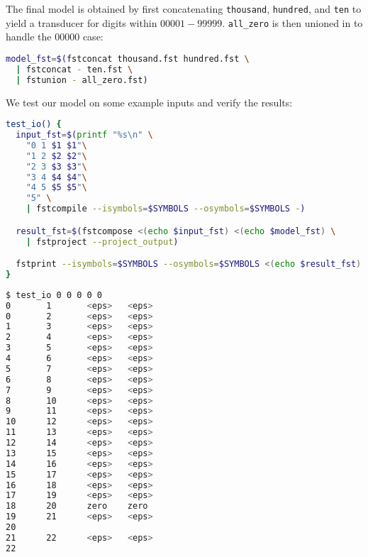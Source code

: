 \documentclass[a4paper,oneside,reqno]{amsart}
\begin{document}
\begin{enumerate}[label=\arabic*.]
    The final model is obtained by first concatenating \texttt{thousand},
    \texttt{hundred}, and \texttt{ten} to yield a transducer for
    digits within $00001-99999$. \texttt{all\_zero} is then
    unioned in to handle the $00000$ case:
    \begin{lstlisting}[language=bash]
model_fst=$(fstconcat thousand.fst hundred.fst \
  | fstconcat - ten.fst \
  | fstunion - all_zero.fst)
    \end{lstlisting}

    We test our model on some example inputs and verify the results:
    \begin{lstlisting}[language=bash]
test_io() {
  input_fst=$(printf "%s\n" \
    "0 1 $1 $1"\
    "1 2 $2 $2"\
    "2 3 $3 $3"\
    "3 4 $4 $4"\
    "4 5 $5 $5"\
    "5" \
    | fstcompile --isymbols=$SYMBOLS --osymbols=$SYMBOLS -)

  result_fst=$(fstcompose <(echo $input_fst) <(echo $model_fst) \
    | fstproject --project_output)

  fstprint --isymbols=$SYMBOLS --osymbols=$SYMBOLS <(echo $result_fst)
}
    \end{lstlisting}

    \begin{lstlisting}[language=bash]
$ test_io 0 0 0 0 0
0       1       <eps>   <eps>
0       2       <eps>   <eps>
1       3       <eps>   <eps>
2       4       <eps>   <eps>
3       5       <eps>   <eps>
4       6       <eps>   <eps>
5       7       <eps>   <eps>
6       8       <eps>   <eps>
7       9       <eps>   <eps>
8       10      <eps>   <eps>
9       11      <eps>   <eps>
10      12      <eps>   <eps>
11      13      <eps>   <eps>
12      14      <eps>   <eps>
13      15      <eps>   <eps>
14      16      <eps>   <eps>
15      17      <eps>   <eps>
16      18      <eps>   <eps>
17      19      <eps>   <eps>
18      20      zero    zero
19      21      <eps>   <eps>
20
21      22      <eps>   <eps>
22
    \end{lstlisting}


\end{enumerate}
\end{document}
